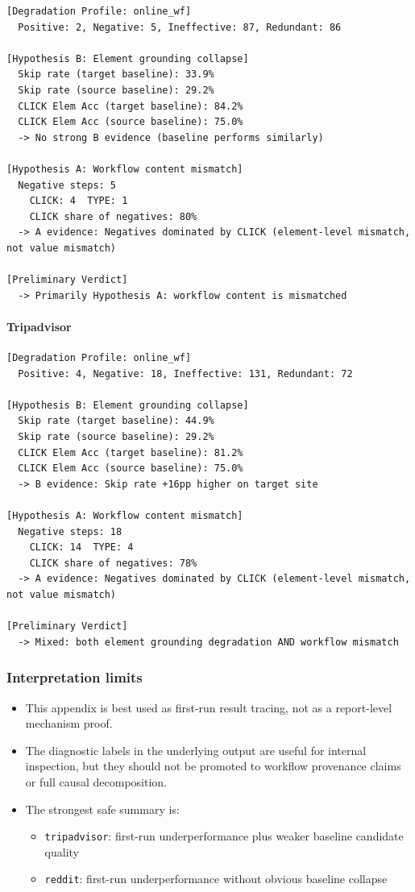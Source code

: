 \begin{verbatim}
[Degradation Profile: online_wf]
  Positive: 2, Negative: 5, Ineffective: 87, Redundant: 86

[Hypothesis B: Element grounding collapse]
  Skip rate (target baseline): 33.9%
  Skip rate (source baseline): 29.2%
  CLICK Elem Acc (target baseline): 84.2%
  CLICK Elem Acc (source baseline): 75.0%
  -> No strong B evidence (baseline performs similarly)

[Hypothesis A: Workflow content mismatch]
  Negative steps: 5
    CLICK: 4  TYPE: 1
    CLICK share of negatives: 80%
  -> A evidence: Negatives dominated by CLICK (element-level mismatch, not value mismatch)

[Preliminary Verdict]
  -> Primarily Hypothesis A: workflow content is mismatched
\end{verbatim}

\paragraph{Tripadvisor}

\begin{verbatim}
[Degradation Profile: online_wf]
  Positive: 4, Negative: 18, Ineffective: 131, Redundant: 72

[Hypothesis B: Element grounding collapse]
  Skip rate (target baseline): 44.9%
  Skip rate (source baseline): 29.2%
  CLICK Elem Acc (target baseline): 81.2%
  CLICK Elem Acc (source baseline): 75.0%
  -> B evidence: Skip rate +16pp higher on target site

[Hypothesis A: Workflow content mismatch]
  Negative steps: 18
    CLICK: 14  TYPE: 4
    CLICK share of negatives: 78%
  -> A evidence: Negatives dominated by CLICK (element-level mismatch, not value mismatch)

[Preliminary Verdict]
  -> Mixed: both element grounding degradation AND workflow mismatch
\end{verbatim}

\subsubsection{Interpretation limits}

\begin{itemize}
\tightlist
\item
  This appendix is best used as first-run result tracing, not as a
  report-level mechanism proof.
\item
  The diagnostic labels in the underlying output are useful for
  internal inspection, but they should not be promoted to workflow
  provenance claims or full causal decomposition.
\item
  The strongest safe summary is:

  \begin{itemize}
  \tightlist
  \item
    \texttt{tripadvisor}: first-run underperformance plus weaker
    baseline candidate quality
  \item
    \texttt{reddit}: first-run underperformance without obvious
    baseline collapse
  \end{itemize}
\end{itemize}


